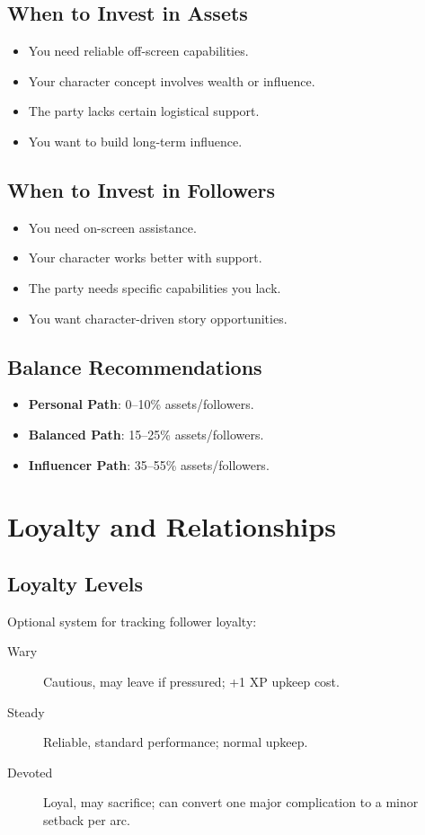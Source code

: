 \subsection*{When to Invest in Assets}
\begin{itemize}
\item You need reliable off-screen capabilities.
\item Your character concept involves wealth or influence.
\item The party lacks certain logistical support.
\item You want to build long-term influence.
\end{itemize}

\subsection*{When to Invest in Followers}
\begin{itemize}
\item You need on-screen assistance.
\item Your character works better with support.
\item The party needs specific capabilities you lack.
\item You want character-driven story opportunities.
\end{itemize}

\subsection*{Balance Recommendations}
\begin{itemize}
\item \textbf{Personal Path}: 0--10\% assets/followers.
\item \textbf{Balanced Path}: 15--25\% assets/followers.
\item \textbf{Influencer Path}: 35--55\% assets/followers.
\end{itemize}

\section{Loyalty and Relationships}

\subsection*{Loyalty Levels}
Optional system for tracking follower loyalty:
\begin{description}
\item[Wary] Cautious, may leave if pressured; +1 XP upkeep cost.
\item[Steady] Reliable, standard performance; normal upkeep.
\item[Devoted] Loyal, may sacrifice; can convert one major complication to a minor setback per arc.
\end{description}

